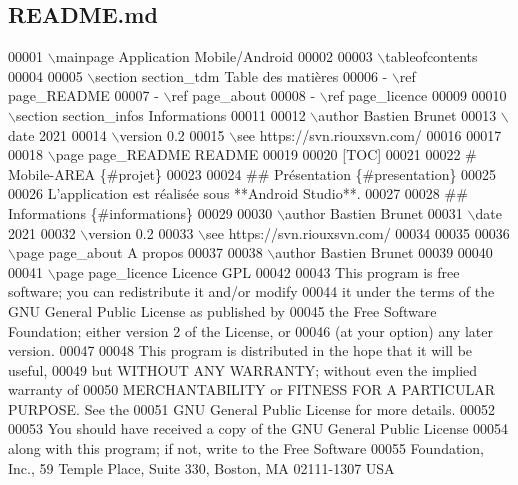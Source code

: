 \hypertarget{_r_e_a_d_m_e_8md_source}{}\subsection{R\+E\+A\+D\+M\+E.\+md}

\begin{DoxyCode}
00001 \(\backslash\)mainpage Application Mobile/Android
00002 
00003 \(\backslash\)tableofcontents
00004 
00005 \(\backslash\)section section\_tdm Table des matières
00006 - \(\backslash\)ref page\_README
00007 - \(\backslash\)ref page\_about
00008 - \(\backslash\)ref page\_licence
00009 
00010 \(\backslash\)section section\_infos Informations
00011 
00012 \(\backslash\)author Bastien Brunet
00013 \(\backslash\)date 2021
00014 \(\backslash\)version 0.2
00015 \(\backslash\)see https://svn.riouxsvn.com/
00016 
00017 
00018 \(\backslash\)page page\_README README
00019 
00020 [TOC]
00021 
00022 # Mobile-AREA \{#projet\}
00023 
00024 ## Présentation \{#presentation\}
00025 
00026 L’application est réalisée sous **Android Studio**.
00027 
00028 ## Informations \{#informations\}
00029 
00030 \(\backslash\)author Bastien Brunet
00031 \(\backslash\)date 2021
00032 \(\backslash\)version 0.2
00033 \(\backslash\)see https://svn.riouxsvn.com/
00034 
00035 
00036 \(\backslash\)page page\_about A propos
00037 
00038 \(\backslash\)author Bastien Brunet
00039 
00040 
00041 \(\backslash\)page page\_licence Licence GPL
00042 
00043 This program is free software; you can redistribute it and/or modify
00044 it under the terms of the GNU General Public License as published by
00045 the Free Software Foundation; either version 2 of the License, or
00046 (at your option) any later version.
00047 
00048 This program is distributed in the hope that it will be useful,
00049 but WITHOUT ANY WARRANTY; without even the implied warranty of
00050 MERCHANTABILITY or FITNESS FOR A PARTICULAR PURPOSE. See the
00051 GNU General Public License for more details.
00052 
00053 You should have received a copy of the GNU General Public License
00054 along with this program; if not, write to the Free Software
00055 Foundation, Inc., 59 Temple Place, Suite 330, Boston, MA 02111-1307 USA
\end{DoxyCode}
